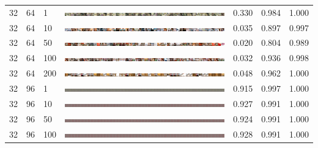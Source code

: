 \documentclass[a4paper]{article}
\begin{document}
\begin{table}[h!]
\begin{center}
{\begin{tabular}{lllcccc}
      32 & 64 & 1   & \includegraphics[width=\textwidth,trim={1536px 0 0 0},clip]{figures/bedrooms_g32_d64_ep1_generator.jpg}    & 0.330 & 0.984 & 1.000\\
      32 & 64 & 10  & \includegraphics[width=\textwidth,trim={1536px 0 0 0},clip]{figures/bedrooms_g32_d64_ep10_generator.jpg}   & 0.035 & 0.897 & 0.997\\
      32 & 64 & 50  & \includegraphics[width=\textwidth,trim={1536px 0 0 0},clip]{figures/bedrooms_g32_d64_ep50_generator.jpg}   & 0.020 & 0.804 & 0.989\\
      32 & 64 & 100 & \includegraphics[width=\textwidth,trim={1536px 0 0 0},clip]{figures/bedrooms_g32_d64_ep100_generator.jpg}  & 0.032 & 0.936 & 0.998\\
      32 & 64 & 200 & \includegraphics[width=\textwidth,trim={1536px 0 0 0},clip]{figures/bedrooms_g32_d64_ep200_generator.jpg}  & 0.048 & 0.962 & 1.000\\
      \hline
      32 & 96 & 1   & \includegraphics[width=\textwidth,trim={1536px 0 0 0},clip]{figures/bedrooms_g32_d96_ep1_generator.jpg}    & 0.915 & 0.997 & 1.000\\
      32 & 96 & 10  & \includegraphics[width=\textwidth,trim={1536px 0 0 0},clip]{figures/bedrooms_g32_d96_ep10_generator.jpg}   & 0.927 & 0.991 & 1.000\\
      32 & 96 & 50  & \includegraphics[width=\textwidth,trim={1536px 0 0 0},clip]{figures/bedrooms_g32_d96_ep50_generator.jpg}   & 0.924 & 0.991 & 1.000\\
      32 & 96 & 100 & \includegraphics[width=\textwidth,trim={1536px 0 0 0},clip]{figures/bedrooms_g32_d96_ep100_generator.jpg}  & 0.928 & 0.991 & 1.000\\

\end{tabular}}
\end{center}
\end{table}
\end{document}
